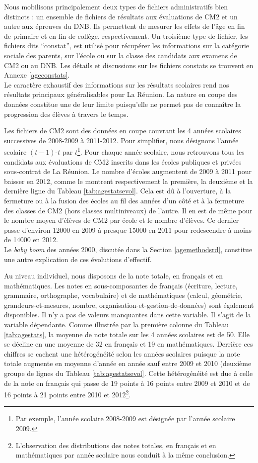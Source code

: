 \documentclass[
]{book}
\begin{document}
Nous mobilisons principalement deux types de fichiers administratifs bien distincts : un ensemble de fichiers de résultats aux évaluations de CM2 et un autre aux épreuves du DNB. Ils permettent de mesurer les effets de l'âge en fin de primaire et en fin de collège, respectivement. Un troisième type de fichier, les fichiers dits ``constat'', est utilisé pour récupérer les informations sur la catégorie sociale des parents, sur l'école ou sur la classe des candidats aux examens de CM2 ou au DNB. Les détails et discussions sur les fichiers constats se trouvent en Annexe \ref{ageconstats}.\\
Le caractère exhaustif des informations sur les résultats scolaires rend nos résultats principaux généralisables pour La Réunion. La nature en coupe des données constitue une de leur limite puisqu'elle ne permet pas de connaître la progression des élèves à travers le temps.

\quad Les fichiers de CM2 sont des données en coupe couvrant les 4 années scolaires successives de 2008-2009 à 2011-2012. Pour simplifier, nous désignons l'année scolaire \((t-1)\text{-}t\) par \(t\)\footnote{Par exemple, l'année scolaire 2008-2009 est désignée par l'année scolaire 2009.}. Pour chaque année scolaire, nous retrouvons tous les candidats aux évaluations de CM2 inscrits dans les écoles publiques et privées sous-contrat de La Réunion. Le nombre d'écoles augmentent de 2009 à 2011 pour baisser en 2012, comme le montrent respectivement la première, la deuxième et la dernière ligne du Tableau \ref{tab:agestatsevol}. Cela est dû à l'ouverture, à la fermeture ou à la fusion des écoles au fil des années d'un côté et à la fermeture des classes de CM2 (hors classes multiniveaux) de l'autre. Il en est de même pour le nombre moyen d'élèves de CM2 par école et le nombre d'élèves. Ce dernier passe d'environ 12000 en 2009 à presque 15000 en 2011 pour redescendre à moins de 14000 en 2012.\\
Le \emph{baby boom} des années 2000, discutée dans la Section \ref{agemethodsrd}, constitue une autre explication de ces évolutions d'effectif.

\quad Au niveau individuel, nous disposons de la note totale, en français et en mathématiques. Les notes en sous-composantes de français (écriture, lecture, grammaire, orthographe, vocabulaire) et de mathématiques (calcul, géométrie, grandeurs-et-mesures, nombre, organisation-et-gestion-de-données) sont également disponibles. Il n'y a pas de valeurs manquantes dans cette variable. Il s'agit de la variable dépendante. Comme illustrée par la première colonne du Tableau \ref{tab:agestats}, la moyenne de note totale sur les 4 années scolaires est de 50. Elle se décline en une moyenne de 32 en français et 19 en mathématiques. Derrière ces chiffres se cachent une hétérogénéité selon les années scolaires puisque la note totale augmente en moyenne d'année en année sauf entre 2009 et 2010 (deuxième groupe de lignes du Tableau \ref{tab:agestatsevol}. Cette hétérogénéité est due à celle de la note en français qui passe de 19 points à 16 points entre 2009 et 2010 et de 16 points à 21 points entre 2010 et 2012\footnote{L'observation des distributions des notes totales, en français et en mathématiques par année scolaire nous conduit à la même conclusion.}.
\end{document}
